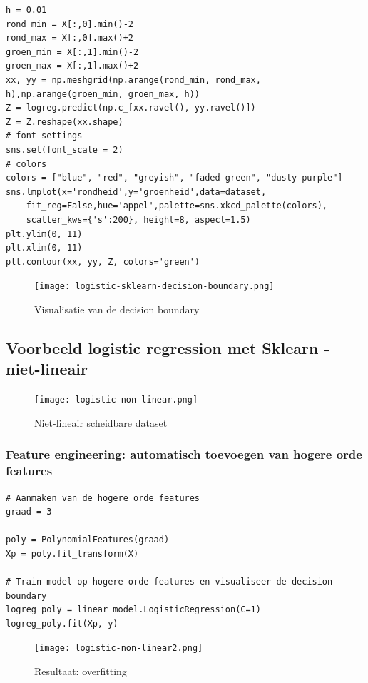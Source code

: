 \documentclass{article}
\begin{document}
\begin{verbatim}
h = 0.01
rond_min = X[:,0].min()-2
rond_max = X[:,0].max()+2
groen_min = X[:,1].min()-2
groen_max = X[:,1].max()+2
xx, yy = np.meshgrid(np.arange(rond_min, rond_max, h),np.arange(groen_min, groen_max, h))
Z = logreg.predict(np.c_[xx.ravel(), yy.ravel()])
Z = Z.reshape(xx.shape)
# font settings
sns.set(font_scale = 2)
# colors
colors = ["blue", "red", "greyish", "faded green", "dusty purple"]
sns.lmplot(x='rondheid',y='groenheid',data=dataset,
    fit_reg=False,hue='appel',palette=sns.xkcd_palette(colors),
    scatter_kws={'s':200}, height=8, aspect=1.5)
plt.ylim(0, 11)
plt.xlim(0, 11)
plt.contour(xx, yy, Z, colors='green')
\end{verbatim}

\begin{figure}[H]
    \centering
    \texttt{[image: logistic-sklearn-decision-boundary.png]}
    \caption{Visualisatie van de decision boundary}
\end{figure}

\subsection{Voorbeeld logistic regression met Sklearn - niet-lineair}

\begin{figure}[H]
    \centering
    \texttt{[image: logistic-non-linear.png]}
    \caption{Niet-lineair scheidbare dataset}
\end{figure}

\subsubsection{Feature engineering: automatisch toevoegen van hogere orde features}

\begin{verbatim}
# Aanmaken van de hogere orde features
graad = 3

poly = PolynomialFeatures(graad)
Xp = poly.fit_transform(X)

# Train model op hogere orde features en visualiseer de decision boundary
logreg_poly = linear_model.LogisticRegression(C=1)
logreg_poly.fit(Xp, y)
\end{verbatim}

\begin{figure}[H]
    \centering
    \texttt{[image: logistic-non-linear2.png]}
    \caption{Resultaat: overfitting}
\end{figure}
\end{document}
